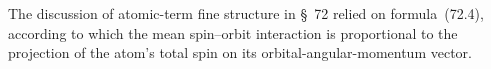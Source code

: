 The discussion of atomic-term fine structure in \S~72 relied on formula~(72.4), according to which the mean spin--orbit interaction is proportional to the projection of the atom's total spin on its orbital-angular-momentum vector.
